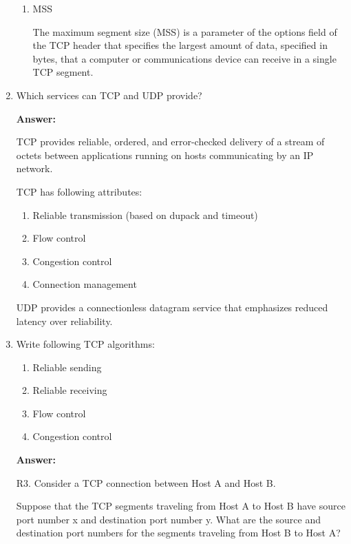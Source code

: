 \begin{enumerate}
\begin{enumerate}
	    \item MSS
	    
	    The maximum segment size (MSS) is a parameter of the options field of the TCP header that specifies the largest amount of data, specified in bytes, that a computer or communications device can receive in a single TCP segment.
	    
	\end{enumerate}
	
	\item Which services can TCP and UDP provide?
	
	\textbf{Answer:}
	
	TCP provides reliable, ordered, and error-checked delivery of a stream of octets between applications running on hosts communicating by an IP network. 
	
	TCP has following attributes:

	\begin{enumerate}
    	\item Reliable transmission (based on dupack and timeout)
    	\item Flow control
    	\item Congestion control
    	\item Connection management
    \end{enumerate}
	
	UDP provides a connectionless datagram service that emphasizes reduced latency over reliability.
	
	\item Write following TCP algorithms:
	
	\begin{enumerate}
    	\item Reliable sending
    	\item Reliable receiving
    	\item Flow control
    	\item Congestion control
	\end{enumerate}

    \textbf{Answer:}
    
    

	\item[R3.] Consider a TCP connection between Host A and Host B. 
	
	Suppose that the TCP segments traveling from Host A to Host B have source port number x and destination port number y. What are the source and destination port numbers for the segments traveling from Host B to Host A?
	

\end{enumerate}
